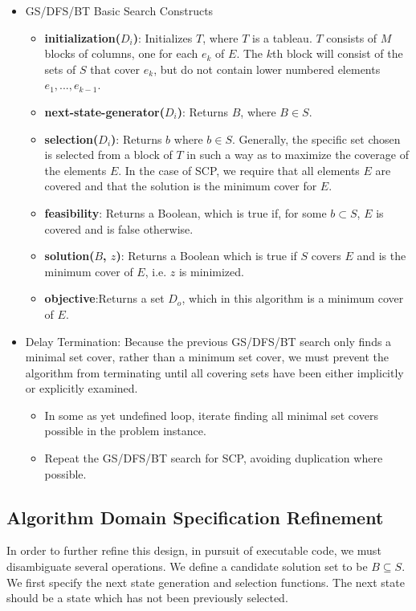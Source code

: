 \documentclass[12pt]{article}
\begin{document}
	\begin{itemize}
		\item GS/DFS/BT Basic Search Constructs
		\begin{itemize}
			\item \textbf{initialization($D_i$)}: Initializes $T$, where $T$ is a tableau. $T$ consists of $M$ blocks of columns, one for each $e_k$ of $E$. The $k$th block will consist of the sets of $S$ that cover $e_k$, but do not contain lower numbered elements $e_1,...,e_{k-1}$.	
			\item \textbf{next-state-generator($D_i$)}: Returns $B$, where $B \in S$.
			\item \textbf{selection($D_i$)}: Returns $b$ where $b \in S$. Generally, the specific set chosen is selected from a block of $T$ in such a way as to maximize the coverage of the elements $E$. In the case of SCP, we require that all elements $E$ are covered and that the solution is the minimum cover for $E$.
			\item \textbf{feasibility}: Returns a Boolean, which is true if, for some $b \subset S$, $E$ is covered and is false otherwise.
			\item \textbf{solution($B$, $z$)}: Returns a Boolean which is true if $S$ covers $E$ and is the minimum cover of $E$, i.e. $z$ is minimized.
			\item \textbf{objective}:Returns a set $D_o$, which in this algorithm is a minimum cover of $E$.
		\end{itemize}
		\item Delay Termination: Because the previous GS/DFS/BT search only finds a minimal set cover, rather than a minimum set cover, we must prevent the algorithm from terminating until all covering sets have been either implicitly or explicitly examined.
		\begin{itemize}
			\item In some as yet undefined loop, iterate finding all minimal set covers possible in the problem instance.
			\item Repeat the GS/DFS/BT search for SCP, avoiding duplication where possible.
		\end{itemize}
	\end{itemize}
	
	\subsection{Algorithm Domain Specification Refinement}
	
	
	In order to further refine this design, in pursuit of executable code, we must disambiguate several operations. We define a candidate solution set to be $B \subseteq S$. We first specify the next state generation and selection functions. The next state should be a state which has not been previously selected.
	
\end{document}
